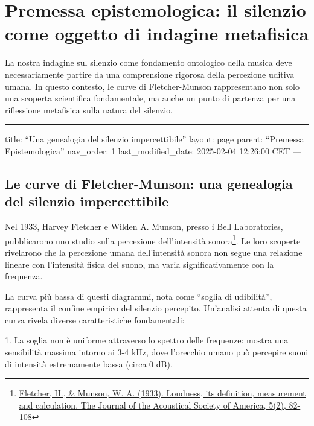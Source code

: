 \documentclass[a4paper,11pt]{article}
\begin{document}
\section{Premessa epistemologica: il silenzio come oggetto di indagine metafisica}\hypertarget{premessa-epistemologica-il-silenzio-come-oggetto-di-indagine-metafisica}{}\label{premessa-epistemologica-il-silenzio-come-oggetto-di-indagine-metafisica}

La nostra indagine sul silenzio come fondamento ontologico della musica
deve necessariamente partire da una comprensione rigorosa della
percezione uditiva umana. In questo contesto, le curve di
Fletcher-Munson rappresentano non solo una scoperta scientifica
fondamentale, ma anche un punto di partenza per una riflessione
metafisica sulla natura del silenzio.



\begin{center}
\rule{3in}{0.4pt}
\end{center}
title: ``Una genealogia del silenzio impercettibile''
layout: page
parent: ``Premessa Epistemologica''
nav\_order: 1
last\_modified\_date: 2025-02-04 12:26:00 CET
---

\subsection{Le curve di Fletcher-Munson: una genealogia del silenzio impercettibile}\hypertarget{le-curve-di-fletcher-munson-una-genealogia-del-silenzio-impercettibile}{}\label{le-curve-di-fletcher-munson-una-genealogia-del-silenzio-impercettibile}

Nel 1933, Harvey Fletcher e Wilden A. Munson, presso i Bell
Laboratories, pubblicarono uno studio sulla percezione dell'intensità
sonora\footnote{\href{https://doi.org/10.1121/1.1915893}{Fletcher, H., \& Munson, W. A. (1933). Loudness, its definition,
measurement and calculation. The Journal of the Acoustical Society
of America, 5(2), 82-108}}. Le loro scoperte rivelarono che la percezione umana
dell'intensità sonora non segue una relazione lineare con l'intensità
fisica del suono, ma varia significativamente con la frequenza.

La curva più bassa di questi diagrammi, nota come ``soglia di udibilità'',
rappresenta il confine empirico del silenzio percepito. Un'analisi
attenta di questa curva rivela diverse caratteristiche fondamentali:

1. La soglia non è uniforme attraverso lo spettro delle frequenze:
mostra una sensibilità massima intorno ai 3-4 kHz, dove l'orecchio umano
può percepire suoni di intensità estremamente bassa (circa 0 dB).
\end{document}
